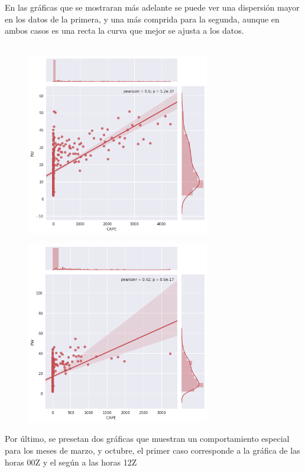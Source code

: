 \documentclass{article}
\begin{document}
En las gráficas que se mostraran más adelante se puede ver una dispersión mayor en los datos de la primera, y una más comprida para la segunda, aunque en ambos casos es una recta la curva que mejor se ajusta a los datos.   \\ 
\\ 
\begin{figure}[htb]
    \begin{center}
    \includegraphics[width=8cm]{Seaborn00z.png} 
    \end{center}
\end{figure}

\begin{figure}[htb]
    \begin{center}
    \includegraphics[width=8cm]{Seaborn12Z.png} 
    \end{center}
\end{figure}

Por último, se presetan dos gráficas que muestran un comportamiento especial para los meses de marzo, y octubre, el primer caso corresponde a la gráfica de las horas 00Z y el según a las horas 12Z \\ 
\end{document}
